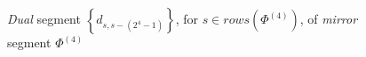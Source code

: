 
\begin{figure}[p]

    \noindent{}

    \captionsetup{singlelinecheck=off}
    \caption[\emph{Dual} segment $\left\lbrace d_{s,s-(2^{4}-1)}\right\rbrace$,
        for $s\in rows\left(\Phi^{(4)}\right)$, in $\mathcal{C}_{\equiv_{2}}^{(5)}$]
        { \emph{Dual} segment $\left\lbrace d_{s,s-(2^{4}-1)}\right\rbrace$,
                for $s\in rows\left(\Phi^{(4)}\right)$, of \emph{mirror} segment $\Phi^{(4)}$ }



    \label{fig:dual-of-mirror-segment}

\end{figure}
